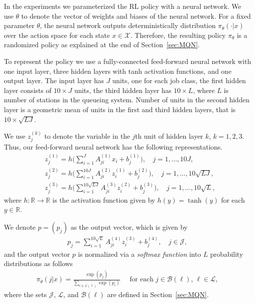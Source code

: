 \documentclass[11pt]{article}
\newcommand{\R}{\mathbb{R}}
\newcommand{\X}{\mathcal{X}}
\newcommand{\LL}{\mathcal{L}}
\newcommand{\J}{\mathcal{J}}
\theoremstyle{definition}
\numberwithin{equation}{section}
\begin{document}
In the experiments we parameterized the RL policy with a neural
network. We use $\theta$ to denote the vector of weights and
  biases of the neural network. For a fixed parameter $\theta$, the
  neural network outputs deterministically distribution
  $\pi_\theta(\cdot|x)$ over the action space for each state
  $x\in \X$. Therefore, the resulting policy $\pi_\theta$ is a randomized policy as explained at the end of Section~\ref{sec:MQN}.


To represent the policy we use a fully-connected  feed-forward neural network with one input layer,   three hidden layers with tanh activation functions, and one output layer. The input layer has $J$ units, one for each job class, the first hidden layer consists of $10\times J$ units, the third hidden layer has $10\times L$, where $L$ is  number of stations in the queueing system. Number of units in the  second hidden layer is a geometric mean of units in the first and third hidden layers, that is $10\times \sqrt{LJ}$.

We use $z^{(k)}_j$ to denote the variable in the $j$th unit of hidden
layer $k$, $k=1, 2, 3$. Thus, our feed-forward neural network has the following representations.
\begin{align*}
  & z^{(1)}_j =  h\Big(\sum_{i=1}^J A^{(1)}_{ji}x_i + b^{(1)}_j\Big), \quad j=1, \ldots, 10J, \\
  & z^{(2)}_j =  h\Big(\sum_{i=1}^{10J} A^{(2)}_{ji}z^{(1)}_i + b^{(2)}_j\Big), \quad j=1, \ldots, 10\sqrt{LJ},\\
  & z^{(3)}_j =  h\Big(\sum_{i=1}^{10\sqrt{LJ}} A^{(3)}_{ji}z^{(2)}_i + b^{(3)}_j\Big), \quad j=1, \ldots, 10\sqrt{L},
\end{align*}
where $h:\R\to\R$ is the activation function given by $h(y)=\tanh(y)$ for each $y\in \R$.


 We denote $p=(p_j)$ as the output vector, which is given by
\begin{align*}
  p_j = \sum_{i=1}^{10\sqrt{L}} A^{(4)}_{ji}z^{(3)}_i + b^{(4)}_j, \quad j\in \J,
\end{align*}
and the output vector $p$ is normalized via a \textit{softmax function}  into $L$ probability
distributions as follows
\begin{align}\label{eq:softmax}
  \pi_{\theta}(j|x) = \frac{\exp(p_j)}{\sum_{i\in \mathcal{L}(\ell)} \exp(p_i)} \quad \text{ for each } j\in \mathcal{B}(\ell), \, \ell\in \LL,
\end{align}
where the sets $\J$, $\LL$, and $\mathcal{B}(\ell)$ are defined in Section~\ref{sec:MQN}.
\end{document}
